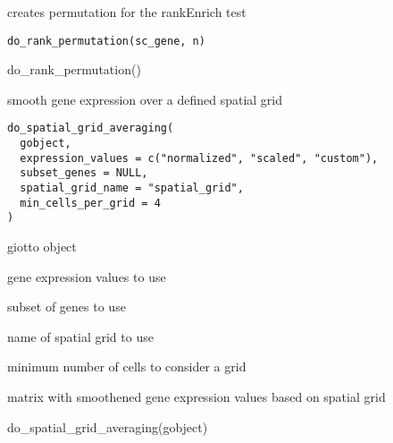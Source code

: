 \documentclass[a4paper]{book}
\begin{document}
%
\begin{Description}\relax
creates permutation for the rankEnrich test
\end{Description}
%
\begin{Usage}
\begin{verbatim}
do_rank_permutation(sc_gene, n)
\end{verbatim}
\end{Usage}
%
\begin{Examples}
\begin{ExampleCode}
    do_rank_permutation()
\end{ExampleCode}
\end{Examples}
%
\begin{Description}\relax
smooth gene expression over a defined spatial grid
\end{Description}
%
\begin{Usage}
\begin{verbatim}
do_spatial_grid_averaging(
  gobject,
  expression_values = c("normalized", "scaled", "custom"),
  subset_genes = NULL,
  spatial_grid_name = "spatial_grid",
  min_cells_per_grid = 4
)
\end{verbatim}
\end{Usage}
%
\begin{Arguments}
\begin{ldescription}
\item[\code{gobject}] giotto object

\item[\code{expression\_values}] gene expression values to use

\item[\code{subset\_genes}] subset of genes to use

\item[\code{spatial\_grid\_name}] name of spatial grid to use

\item[\code{min\_cells\_per\_grid}] minimum number of cells to consider a grid
\end{ldescription}
\end{Arguments}
%
\begin{Value}
matrix with smoothened gene expression values based on spatial grid
\end{Value}
%
\begin{Examples}
\begin{ExampleCode}
    do_spatial_grid_averaging(gobject)
\end{ExampleCode}
\end{Examples}
\end{document}
